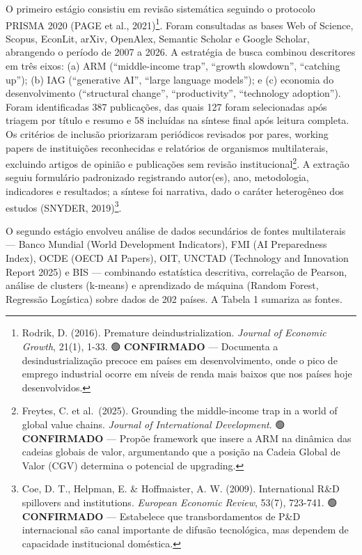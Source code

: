 \documentclass[
  brazilian,
  12pt,
]{article}
\begin{document}
O primeiro estágio consistiu em revisão sistemática seguindo o protocolo PRISMA 2020 (PAGE et al., 2021)\footnote{Rodrik, D. (2016). Premature deindustrialization. \emph{Journal of Economic Growth}, 21(1), 1-33. 🟢 \textbf{CONFIRMADO} --- Documenta a desindustrialização precoce em países em desenvolvimento, onde o pico de emprego industrial ocorre em níveis de renda mais baixos que nos países hoje desenvolvidos.}. Foram consultadas as bases Web of Science, Scopus, EconLit, arXiv, OpenAlex, Semantic Scholar e Google Scholar, abrangendo o período de 2007 a 2026. A estratégia de busca combinou descritores em três eixos: (a) ARM (``middle-income trap'', ``growth slowdown'', ``catching up''); (b) IAG (``generative AI'', ``large language models''); e (c) economia do desenvolvimento (``structural change'', ``productivity'', ``technology adoption''). Foram identificadas 387 publicações, das quais 127 foram selecionadas após triagem por título e resumo e 58 incluídas na síntese final após leitura completa. Os critérios de inclusão priorizaram periódicos revisados por pares, working papers de instituições reconhecidas e relatórios de organismos multilaterais, excluindo artigos de opinião e publicações sem revisão institucional\footnote{Freytes, C. et al.~(2025). Grounding the middle-income trap in a world of global value chains. \emph{Journal of International Development}. 🟢 \textbf{CONFIRMADO} --- Propõe framework que insere a ARM na dinâmica das cadeias globais de valor, argumentando que a posição na Cadeia Global de Valor (CGV) determina o potencial de upgrading.}. A extração seguiu formulário padronizado registrando autor(es), ano, metodologia, indicadores e resultados; a síntese foi narrativa, dado o caráter heterogêneo dos estudos (SNYDER, 2019)\footnote{Coe, D. T., Helpman, E. \& Hoffmaister, A. W. (2009). International R\&D spillovers and institutions. \emph{European Economic Review}, 53(7), 723-741. 🟢 \textbf{CONFIRMADO} --- Estabelece que transbordamentos de P\&D internacional são canal importante de difusão tecnológica, mas dependem de capacidade institucional doméstica.}.

O segundo estágio envolveu análise de dados secundários de fontes multilaterais --- Banco Mundial (World Development Indicators), FMI (AI Preparedness Index), OCDE (OECD AI Papers), OIT, UNCTAD (Technology and Innovation Report 2025) e BIS --- combinando estatística descritiva, correlação de Pearson, análise de clusters (k-means) e aprendizado de máquina (Random Forest, Regressão Logística) sobre dados de 202 países. A Tabela 1 sumariza as fontes.
\end{document}
